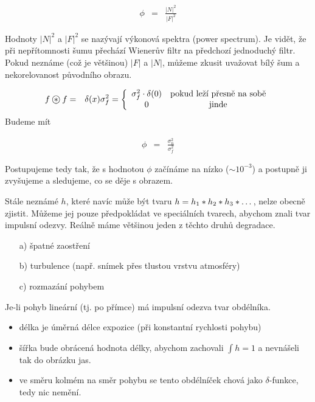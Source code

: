 \begin{eqnarray}
\phi&=&\frac{|N|^2}{|F|^2}
\end{eqnarray}

Hodnoty $|N|^2$ a $|F|^2$ se nazývají výkonová spektra (power spectrum). Je vidět, že při nepřítomnosti šumu 
přechází Wienerův filtr na předchozí jednoduchý filtr. Pokud neznáme (což je většinou) $|F|$ a $|N|$, můžeme zkusit
uvažovat bílý šum a nekorelovanost původního obrazu.

\begin{eqnarray}
 f\corr f&=&\delta(x)\sigma_f^2=\left\{\begin{array}{cc}\sigma_f^2\cdot\delta(0)&\hbox{pokud leží přesně na sobě}\\0&\hbox{jinde}\end{array}\right.
\end{eqnarray}
Budeme mít

\begin{eqnarray}
\phi&=&\frac{\sigma_n^2}{\sigma_f^2}
\end{eqnarray}

Postupujeme tedy tak, že s hodnotou $\phi$ začínáme na nízko ($\sim 10^{-3}$) a postupně ji zvyšujeme a sledujeme, co se 
děje s obrazem. 

Stále neznámé $h$, které navíc může být tvaru $h=h_1\ast h_2\ast h_3 \ast \dots$, nelze obecně zjistit. Můžeme jej
pouze předpokládat ve speciálních tvarech, abychom znali tvar impulsní odezvy. Reálně máme většinou jeden z těchto druhů degradace.

\begin{itemize}
\item[a)] špatné zaostření
\item[b)] turbulence (např. snímek přes tlustou vrstvu atmosféry)
\item[c)] rozmazání pohybem
\end{itemize}

 Je-li pohyb lineární (tj. po přímce) má impulsní odezva tvar obdélníka. 
\begin{itemize}
\item délka je úměrná délce expozice (při konstantní rychlosti pohybu)
\item šířka bude obrácená hodnota délky, abychom zachovali $\int h=1$ a nevnášeli tak do obrázku
jas. 
\item ve směru kolmém na směr pohybu se tento obdélníček chová jako $\delta$-funkce, tedy nic nemění. 
\end{itemize}

